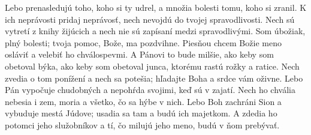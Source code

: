 \versseparator
Lebo prenasledujú toho, koho si ty udrel,
a množia bolesti tomu, koho si zranil.
\versseparator
K ich neprávosti pridaj neprávosť,
nech nevojdú do tvojej spravodlivosti.
\versseparator
Nech sú vytretí z knihy žijúcich
a nech nie sú zapísaní medzi spravodlivými.
\versseparator
Som úbožiak, plný bolesti;
tvoja pomoc, Bože, ma pozdvihne.
\versseparator
Piesňou chcem Božie meno osláviť
a velebiť ho chválospevmi.
\versseparator
A Pánovi to bude milšie, ako keby som obetoval býka,
ako keby som obetoval junca, ktorému rastú rožky a ratice.
\versseparator
Nech zvedia o tom ponížení a nech sa potešia;
hľadajte Boha a srdce vám oživne.
\versseparator
Lebo Pán vypočuje chudobných
a nepohŕda svojimi, keď sú v zajatí.
\versseparator
Nech ho chvália nebesia i zem,
moria a všetko, čo sa hýbe v nich.
\versseparator
Lebo Boh zachráni Sion
a vybuduje mestá Júdove;
\versseparator
usadia sa tam a budú ich majetkom.
\versseparator
A zdedia ho potomci jeho služobníkov
a tí, čo milujú jeho meno, budú v ňom prebývať.